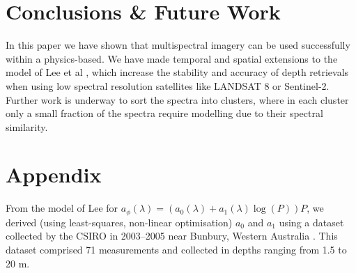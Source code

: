 \documentclass[12pt]{article}
\numberwithin{equation}{section}
\begin{document}

\section{Conclusions \& Future Work}

In this paper we have shown that multispectral imagery can be used successfully within a 
physics-based. We have made temporal and spatial extensions to the model of Lee et al 
\cite{lee1998}\cite{lee1999}\cite{lee2001}, which increase the stability and accuracy 
of depth retrievals when using low spectral resolution satellites like LANDSAT 8 or 
Sentinel-2. \\

Further work is underway to sort the spectra into clusters, where in each cluster only a 
small fraction of the spectra require modelling due to their spectral similarity. 



\appendix
\section{Appendix}
From the model of Lee for $a_{\phi}(\lambda) = \left(a_0(\lambda) + a_1(\lambda)\log(P)\right)P$, 
we derived (using least-squares, non-linear optimisation) $a_0$ and $a_1$ using a dataset 
collected by the CSIRO in 2003--2005 near Bunbury, Western Australia \cite{csiro2005}. This 
dataset comprised 71 measurements and collected in depths ranging from 1.5 to 20 m. 
\end{document}
